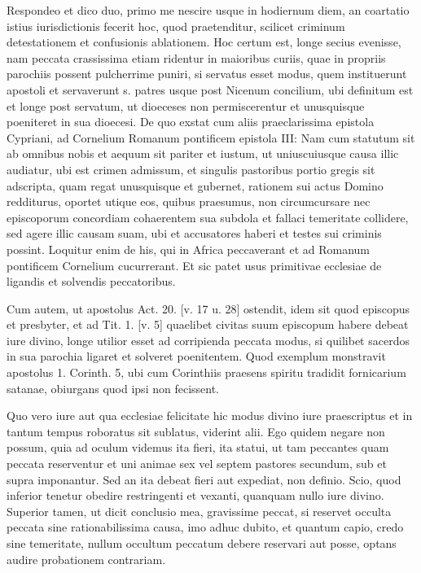 Respondeo et dico duo, primo me nescire usque in hodiernum diem, an coartatio istius iurisdictionis fecerit hoc, quod praetenditur, scilicet criminum detestationem et confusionis ablationem. Hoc certum est, longe secius evenisse, nam peccata crassissima etiam ridentur in maioribus curiis, quae in propriis parochiis possent pulcherrime puniri, si servatus esset modus, quem instituerunt apostoli et servaverunt s. patres usque post Nicenum concilium, ubi definitum est et longe post servatum, ut dioeceses non permiscerentur et unusquisque poeniteret in sua dioecesi. De \marginpar{\small[379]} quo exstat cum aliis praeclarissima epistola Cypriani, ad Cornelium Romanum pontificem epistola III: Nam cum statutum sit ab omnibus nobis et aequum sit pariter et iustum, ut uniuscuiusque causa illic audiatur, ubi est crimen admissum, et singulis pastoribus portio gregis sit adscripta, quam regat unusquisque et gubernet, rationem sui actus Domino redditurus, oportet utique eos, quibus praesumus, non circumcursare nec episcoporum concordiam cohaerentem sua subdola et fallaci temeritate collidere, sed agere illic causam suam, ubi et accusatores haberi et testes sui criminis possint. Loquitur enim de his, qui in Africa peccaverant et ad Romanum pontificem Cornelium cucurrerant. Et sic patet usus primitivae ecclesiae de ligandis et solvendis peccatoribus.

Cum autem, ut apostolus Act. 20. [v. 17 u. 28] ostendit, idem sit quod episcopus et presbyter, et ad Tit. 1. [v. 5] quaelibet civitas suum episcopum habere debeat iure divino, longe utilior esset ad corripienda peccata modus, si quilibet sacerdos in sua parochia ligaret et solveret poenitentem. Quod exemplum monstravit apostolus 1. Corinth. 5, ubi cum Corinthiis praesens spiritu tradidit fornicarium satanae, obiurgans quod ipsi non fecissent.

Quo vero iure aut qua ecclesiae felicitate hic modus divino iure praescriptus et in tantum tempus roboratus sit sublatus, viderint alii. Ego quidem negare non possum, quia ad oculum videmus ita fieri, ita statui, ut tam peccantes quam peccata reserventur et uni animae sex vel septem pastores secundum, sub et supra imponantur. Sed an ita debeat fieri aut expediat, non definio. Scio, quod inferior tenetur obedire restringenti et vexanti, quanquam nullo iure divino. Superior tamen, ut dicit conclusio mea, gravissime peccat, si reservet occulta peccata sine rationabilissima causa, imo adhuc dubito, et quantum capio, credo sine temeritate, nullum occultum peccatum debere reservari aut posse, optans audire probationem contrariam.

